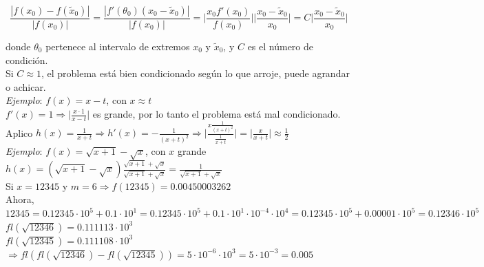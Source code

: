 $$\frac{|f(x_{0}) - f(\tilde{x}_{0})|}{|f(x_{0})|} = \frac{|f'(\theta_{0})(x_{0} - \tilde{x}_{0})|}{|f(x_{0})|} = \bigg|\frac{x_{0}f'(x_{0})}{f(x_{0})}\bigg| \bigg|\frac{x_{0} - \tilde{x}_{0}}{x_{0}}\bigg| = C \bigg|\frac{x_{0} - \tilde{x}_{0}}{x_{0}}\bigg|$$

donde $\theta_{0}$ pertenece al intervalo de extremos $x_{0}$ y $\tilde{x}_{0}$, y $C$ es el n\'umero de condici\'on.\\

Si $C \approx 1$, el problema est\'a bien condicionado seg\'un lo que arroje, puede agrandar o achicar.\\

\textit{Ejemplo}: $f(x) = x - t$, con $x \approx t$\\

$f'(x) = 1 \Rightarrow \bigg|\frac{x\cdot1}{x - t}\bigg|$ es grande, por lo tanto el problema est\'a mal condicionado.\\

Aplico $h(x) = \frac{1}{x + t} \Rightarrow h'(x) = -\frac{1}{(x + t)^{2}} \Rightarrow \bigg|\frac{x \frac{1}{(x + t)^{2}}}{\frac{1}{x + t}}\bigg| = \bigg|\frac{x}{x + t}\bigg| \approx \frac{1}{2}$\\

\textit{Ejemplo}: $f(x) = \sqrt{x + 1} - \sqrt{x}$, con $x$ grande\\

$h(x) = (\sqrt{x + 1} - \sqrt{x}) \frac{\sqrt{x + 1} + \sqrt{x}}{\sqrt{x + 1} + \sqrt{x}} = \frac{1}{\sqrt{x + 1} + \sqrt{x}}$\\

Si $x = 12345$ y $m = 6 \Rightarrow f(12345) = 0.00450003262$\\

Ahora, $12345 = 0.12345\cdot10^{5} + 0.1\cdot10^{1} = 0.12345\cdot10^{5} + 0.1\cdot10^{1}\cdot10^{-4}\cdot10^{4} = 0.12345\cdot10^{5} + 0.00001\cdot10^{5} = 0.12346\cdot10^{5}$\\

$fl(\sqrt{12346}) = 0.111113\cdot10^{3}$\\

$fl(\sqrt{12345}) = 0.111108\cdot10^{3}$\\

$\Rightarrow fl(fl(\sqrt{12346}) - fl(\sqrt{12345})) = 5\cdot10^{-6}\cdot10^{3} = 5\cdot10^{-3} = 0.005$